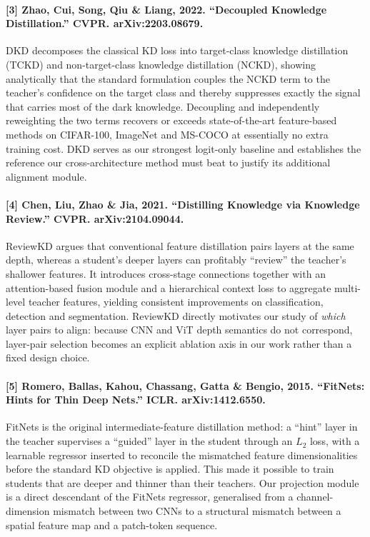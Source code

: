 \documentclass[11pt, letterpaper]{article}
\begin{document}
\paragraph{[3] Zhao, Cui, Song, Qiu \& Liang, 2022. ``Decoupled Knowledge Distillation.'' CVPR. arXiv:2203.08679.}
DKD decomposes the classical KD loss into target-class knowledge distillation
(TCKD) and non-target-class knowledge distillation (NCKD), showing analytically
that the standard formulation couples the NCKD term to the teacher's confidence
on the target class and thereby suppresses exactly the signal that carries most
of the dark knowledge. Decoupling and independently reweighting the two terms
recovers or exceeds state-of-the-art feature-based methods on CIFAR-100,
ImageNet and MS-COCO at essentially no extra training cost. DKD serves as our
strongest logit-only baseline and establishes the reference our cross-architecture
method must beat to justify its additional alignment module.

\paragraph{[4] Chen, Liu, Zhao \& Jia, 2021. ``Distilling Knowledge via Knowledge Review.'' CVPR. arXiv:2104.09044.}
ReviewKD argues that conventional feature distillation pairs layers at the same
depth, whereas a student's deeper layers can profitably ``review'' the teacher's
shallower features. It introduces cross-stage connections together with an
attention-based fusion module and a hierarchical context loss to aggregate
multi-level teacher features, yielding consistent improvements on
classification, detection and segmentation. ReviewKD directly motivates our
study of \emph{which} layer pairs to align: because CNN and ViT depth semantics
do not correspond, layer-pair selection becomes an explicit ablation axis in our
work rather than a fixed design choice.

\paragraph{[5] Romero, Ballas, Kahou, Chassang, Gatta \& Bengio, 2015. ``FitNets: Hints for Thin Deep Nets.'' ICLR. arXiv:1412.6550.}
FitNets is the original intermediate-feature distillation method: a ``hint''
layer in the teacher supervises a ``guided'' layer in the student through an
$L_2$ loss, with a learnable regressor inserted to reconcile the mismatched
feature dimensionalities before the standard KD objective is applied. This made
it possible to train students that are deeper and thinner than their teachers.
Our projection module is a direct descendant of the FitNets regressor,
generalised from a channel-dimension mismatch between two CNNs to a
structural mismatch between a spatial feature map and a patch-token sequence.
\end{document}
